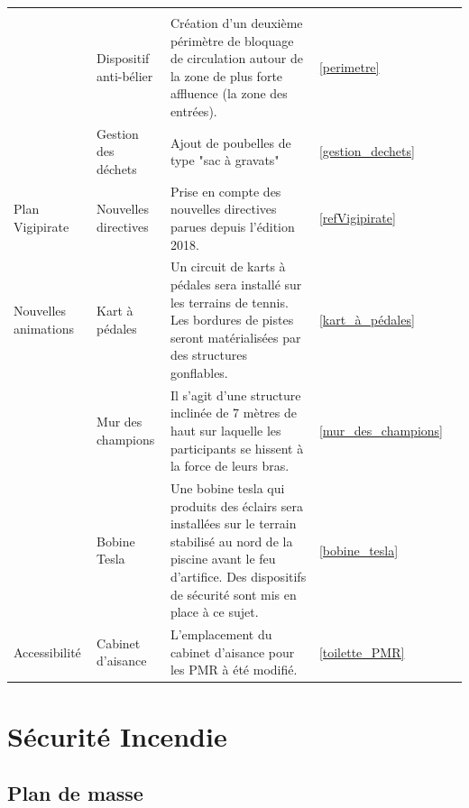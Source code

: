 \documentclass[hidelinks, paper=a4, fontsize=13pt]{report}
\begin{document}
\begin{tabular}{|m{}|m{}|m{}|m{}|m{}|}
\pageref{refProcedurePMA}\\
\cmidrule{2-5}
 & Dispositif anti-bélier & Création d'un deuxième périmètre de bloquage de circulation autour de la zone de plus forte affluence (la zone des entrées). & \ref{perimetre}&\pageref{perimetre}\\
\cmidrule{2-5}
 & Gestion des déchets & Ajout de poubelles de type "sac à gravats" & \ref{gestion_dechets} & \pageref{gestion_dechets}\\
\midrule
Plan Vigipirate & Nouvelles directives & Prise en compte des nouvelles directives parues depuis l'édition 2018. & \ref{refVigipirate}&\pageref{refVigipirate}\\
\midrule
\vspace{1.8cm}
Nouvelles animations & Kart à pédales & Un circuit de karts à pédales sera installé sur les terrains de tennis. Les bordures de pistes seront matérialisées par des structures gonflables. & \ref{kart_à_pédales}&\pageref{kart_à_pédales}\\
\cmidrule{2-5}
 & Mur des champions & Il s'agit d'une structure inclinée de 7 mètres de haut sur laquelle les participants se hissent à la force de leurs bras. & \ref{mur_des_champions} & \pageref{mur_des_champions}\\
\cmidrule{2-5}
 & Bobine Tesla & Une bobine tesla qui produits des éclairs sera installées sur le terrain stabilisé au nord de la piscine avant le feu d'artifice. Des dispositifs de sécurité sont mis en place à ce sujet. & \ref{bobine_tesla} & \pageref{bobine_tesla}\\
\midrule
Accessibilité & Cabinet d'aisance & L'emplacement du cabinet d'aisance pour les PMR à été modifié. & \ref{toilette_PMR}&\pageref{toilette_PMR}\\
\bottomrule

\end{tabular}

\newpage


\chapter{ Sécurité Incendie}

\section{Plan de masse}
\end{document}
